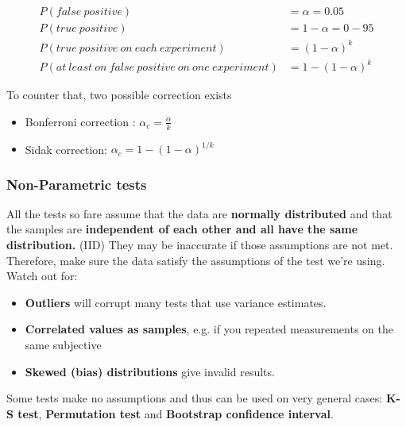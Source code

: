 \begin{equation} \label{eq1}
\begin{split}
P(false \: positive) &= \alpha = 0.05 \\ 
P(true \: positive) &= 1 - \alpha = 0-95 \\
P(true \: positive \: on \: each \: experiment) &= (1 - \alpha)^k \\
P(at \: least \: on \: false \: positive \: on \: one \: experiment) &= 1 - (1 - \alpha)^k
\end{split}
\end{equation}

To counter that, two possible correction exists
\begin{itemize}
  \item Bonferroni correction : $\alpha_c = \frac{\alpha}{k}$ 
  \item Sidak correction: $\alpha_c = 1- (1 - \alpha)^{1/k} $
\end{itemize}


\subsubsection{Non-Parametric tests}

All the tests so fare assume that the data are {\bf normally distributed} and that the samples are {\bf independent of each other and all have the same distribution.} (IID) They may be inaccurate if those assumptions are not met. Therefore, make sure the data satisfy the assumptions of the test we're using. Watch out for:
\begin{itemize}
 \item \textbf{Outliers} will corrupt many tests that use variance estimates.
 \item \textbf{Correlated values as samples}, e.g. if you repeated measurements on the same subjective
 \item \textbf{Skewed (bias) distributions} give invalid results.
\end{itemize}

Some tests make no assumptions and thus can be used on very general cases: \textbf{K-S test}, \textbf{Permutation test} and \textbf{Bootstrap confidence interval}.


